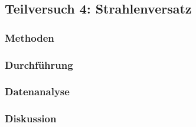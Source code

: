 \subsection{Teilversuch 4: Strahlenversatz}

	\subsubsection*{Methoden}
		
		
	\subsubsection*{Durchführung}
	
	
	\subsubsection*{Datenanalyse}
		
	
	\subsubsection*{Diskussion}
	
